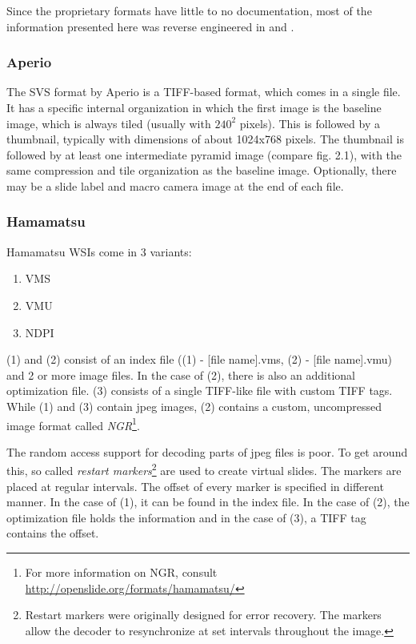Since the proprietary formats have little to no documentation, most of the information presented here was reverse engineered in \cite{Goode13} and \cite{web:openslide}.


\subsubsection{Aperio}
The SVS format by Aperio is a TIFF-based format, which comes in a single file\cite{Goode13}. It has a specific internal organization in which the first image is the baseline image, which is always tiled (usually with $240^2$ pixels). This is followed by a thumbnail, typically with dimensions of about 1024x768 pixels. The thumbnail is followed by at least one intermediate pyramid image (compare fig. 2.1), with the same compression and tile organization as the baseline image\cite{web:openslide}. Optionally, there may be a slide label and macro camera image at the end of each file\cite{web:openslide}.


\subsubsection{Hamamatsu}
Hamamatsu WSIs come in 3 variants:
\begin{enumerate}[(1)]
	\item VMS
	\item VMU
	\item NDPI
\end{enumerate}

(1) and (2) consist of an index file ((1) - [file name].vms, (2) - [file name].vmu) and 2 or more image files. In the case of (2), there is also an additional optimization file. (3) consists of a single TIFF-like file with custom TIFF tags. While (1) and (3) contain jpeg images, (2) contains a custom, uncompressed image format called \emph{NGR}\footnote{For more information on NGR, consult \url{http://openslide.org/formats/hamamatsu/}}\cite{web:openslide}.

The random access support for decoding parts of jpeg files is poor. To get around this, so called \emph{restart markers}\footnote{Restart markers were originally designed for error recovery. The markers allow the decoder to resynchronize at set intervals throughout the image\cite{Goode13}.} are used to create virtual slides\cite{Goode13}. The markers are placed at regular intervals. The offset of every marker is specified in different manner. In the case of (1), it can be found in the index file. In the case of (2), the optimization file holds the information and in the case of (3), a TIFF tag contains the offset\cite{web:openslide}.


